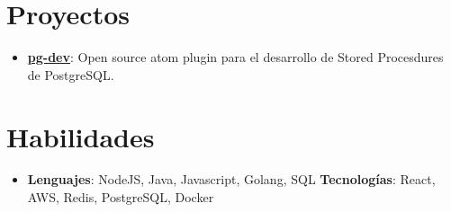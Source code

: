 \documentclass[letterpaper,11pt]{article}
\newcommand{\resumeItem}[2]{
      \item\small{
        \textbf{#1}{: #2 \vspace{-2pt}}
      }
    }
\newcommand{\resumeSubItem}[2]{\resumeItem{#1}{#2}\vspace{-4pt}}
\newcommand{\resumeSubHeadingListStart}{\begin{itemize}[leftmargin=*]}
\newcommand{\resumeSubHeadingListEnd}{\end{itemize}}
\begin{document}
    \section{Proyectos}
      \resumeSubHeadingListStart
        \resumeSubItem{\href{https://github.com/arianbessonart/pg-dev}{pg-dev}}
          {Open source atom plugin para el desarrollo de Stored Procesdures de PostgreSQL.}
      \resumeSubHeadingListEnd

    \section{Habilidades}
     \resumeSubHeadingListStart
       \item{
         \textbf{Lenguajes}{: NodeJS, Java, Javascript, Golang, SQL}
         \hfill
         \textbf{Tecnolog\'ias}{: React, AWS, Redis, PostgreSQL, Docker}
       }
     \resumeSubHeadingListEnd
    
\end{document}
